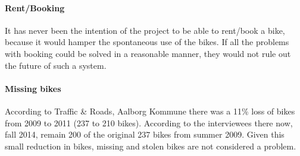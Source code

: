 \paragraph{Rent/Booking}
It has never been the intention of the project to be able to rent/book a bike, because it would hamper the spontaneous use of the bikes.
If all the problems with booking could be solved in a reasonable manner, they would not rule out the future of such a system.


\paragraph{Missing bikes}
According to Traffic \& Roads, Aalborg Kommune\cite{cykelplanlaegning} there was a 11\% loss of bikes from 2009 to 2011 (237 to 210 bikes).
According to the interviewees there now, fall 2014, remain 200 of the original 237 bikes from summer 2009. 
Given this small reduction in bikes, missing and stolen bikes are not considered a problem.